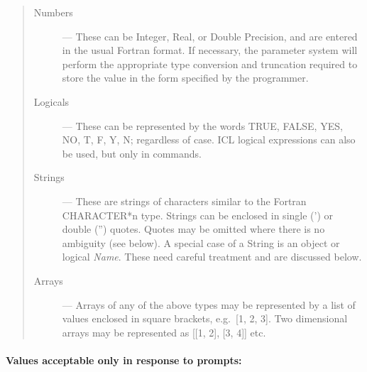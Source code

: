 \begin{quote}
\begin{description}
 \item [Numbers] --- These can be Integer, Real, or Double Precision, and are
  entered in the usual Fortran format.
  If necessary, the parameter system will perform the appropriate type
  conversion and truncation required to store the value in the form specified
  by the programmer.
 \item [Logicals] --- These can be represented by the words TRUE, FALSE,
  YES, NO, T, F, Y, N; regardless of case.
  ICL logical expressions can also be used, but only in commands.
 \item [Strings] --- These are strings of characters similar to the Fortran
  CHARACTER*n type.
  Strings can be enclosed in single (') or double ('') quotes.
  Quotes may be omitted where there is no ambiguity (see below).
  A special case of a String is an object or logical {\em Name}.
  These need careful treatment and are discussed below.
 \item [Arrays] --- Arrays of any of the above types may be represented by
  a list of values enclosed in square brackets, e.g.\ [1, 2, 3].
  Two dimensional arrays may be represented as [[1, 2], [3, 4]] etc.
\end{description}
\end{quote}

\paragraph{Values acceptable only in response to prompts:}\hfill

